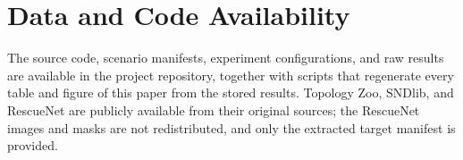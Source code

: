 \section*{Data and Code Availability}

The source code, scenario manifests, experiment configurations, and raw results are available in the project repository, together with scripts that regenerate every table and figure of this paper from the stored results. Topology Zoo, SNDlib, and RescueNet are publicly available from their original sources; the RescueNet images and masks are not redistributed, and only the extracted target manifest is provided.
